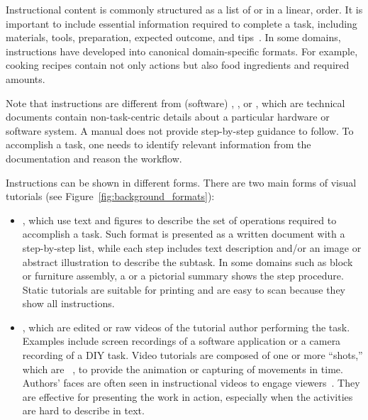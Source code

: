 Instructional content is commonly structured as a list of  or  in a linear,  order.
%
It is important to include essential information required to complete a task, including materials, tools, preparation, expected outcome, and tips~\cite{Torrey:2007he}.
%
In some domains, instructions have developed into canonical domain-specific formats. For example, cooking recipes contain not only actions but also food ingredients and required amounts.

Note that instructions are different from (software) , , or , which are technical documents contain non-task-centric details about a particular hardware or software system. A manual does not provide step-by-step guidance to follow. To accomplish a task, one needs to identify relevant information from the documentation and reason the workflow.


Instructions can be shown in different forms. There are two main forms of visual tutorials (see Figure~\ref{fig:background_formats}):
\begin{itemize}
  \item {}, which use text and figures to describe the set of operations required to accomplish a task. Such format is presented as a written document with a step-by-step list, while each step includes text description and/or an image or abstract illustration to describe the subtask. In some domains such as block or furniture assembly, a  or a pictorial summary shows the step procedure. Static tutorials are suitable for printing and are easy to scan because they show all instructions.
  \item {}, which are edited or raw videos of the tutorial author performing the task. Examples include screen recordings of a software application or a camera recording of a DIY task.
  Video tutorials are composed of one or more ``shots,'' which are ~\cite{Goldman:2007:FVA:1354647}, to provide the animation or capturing of movements in time. Authors' faces are often seen in instructional videos to engage viewers~\cite{Kizilcec:2014:SFV:2556288.2557207}.
  They are effective for presenting the work in action, especially when the activities are hard to describe in text.
\end{itemize}

